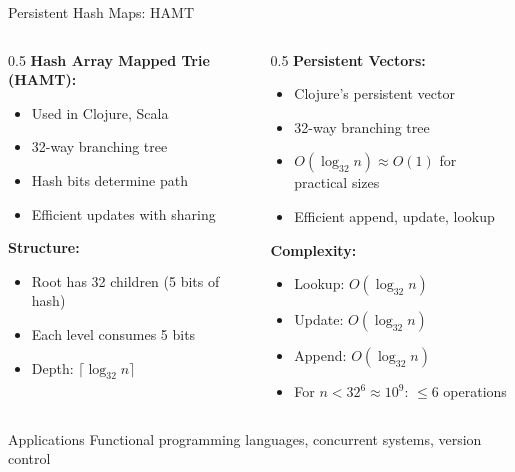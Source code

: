 \documentclass[aspectratio=169,xcolor=dvipsnames]{beamer}
\begin{document}
\begin{frame}{Persistent Hash Maps: HAMT}
  \begin{columns}
    \begin{column}{0.5\textwidth}
      \textbf{Hash Array Mapped Trie (HAMT):}
      \begin{itemize}
        \item Used in Clojure, Scala
        \item 32-way branching tree
        \item Hash bits determine path
        \item Efficient updates with sharing
      \end{itemize}

      \vspace{0.3cm}
      \textbf{Structure:}
      \begin{itemize}
        \item Root has 32 children (5 bits of hash)
        \item Each level consumes 5 bits
        \item Depth: $\lceil \log_{32} n \rceil$
      \end{itemize}
    \end{column}

    \begin{column}{0.5\textwidth}
      \textbf{Persistent Vectors:}
      \begin{itemize}
        \item Clojure's persistent vector
        \item 32-way branching tree
        \item $O(\log_{32} n) \approx O(1)$ for practical sizes
        \item Efficient append, update, lookup
      \end{itemize}

      \vspace{0.3cm}
      \textbf{Complexity:}
      \begin{itemize}
        \item Lookup: $O(\log_{32} n)$
        \item Update: $O(\log_{32} n)$
        \item Append: $O(\log_{32} n)$
        \item For $n < 32^6 \approx 10^9$: $\le 6$ operations
      \end{itemize}
    \end{column}
  \end{columns}

  \vspace{0.3cm}
  \begin{block}{Applications}
    Functional programming languages, concurrent systems, version control
  \end{block}
\end{frame}
\end{document}
